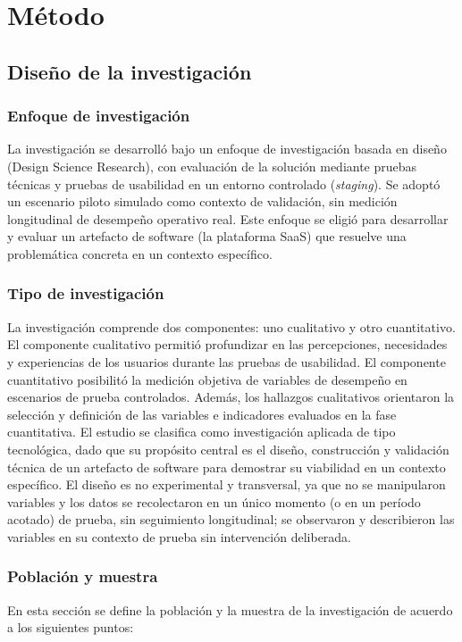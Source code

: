   \chapter{Método}

  \section{Diseño de la investigación}

  \subsection{Enfoque de investigación}

  La investigación se desarrolló bajo un enfoque de investigación basada en diseño (Design Science Research), con evaluación de la solución mediante pruebas técnicas y pruebas de usabilidad en un entorno controlado (\textit{staging}). Se adoptó un escenario piloto simulado como contexto de validación, sin medición longitudinal de desempeño operativo real. Este enfoque se eligió para desarrollar y evaluar un artefacto de software (la plataforma SaaS) que resuelve una problemática concreta en un contexto específico.

  \subsection{Tipo de investigación}
  La investigación comprende dos componentes: uno cualitativo y otro cuantitativo. El componente cualitativo permitió profundizar en las percepciones, necesidades y experiencias de los usuarios durante las pruebas de usabilidad. El componente cuantitativo posibilitó la medición objetiva de variables de desempeño en escenarios de prueba controlados. Además, los hallazgos cualitativos orientaron la selección y definición de las variables e indicadores evaluados en la fase cuantitativa. El estudio se clasifica como investigación aplicada de tipo tecnológica, dado que su propósito central es el diseño, construcción y validación técnica de un artefacto de software para demostrar su viabilidad en un contexto específico. El diseño es no experimental y transversal, ya que no se manipularon variables y los datos se recolectaron en un único momento (o en un período acotado) de prueba, sin seguimiento longitudinal; se observaron y describieron las variables en su contexto de prueba sin intervención deliberada.

  \subsection{Población y muestra}
  En esta sección se define la población y la muestra de la investigación de acuerdo a los siguientes puntos:

